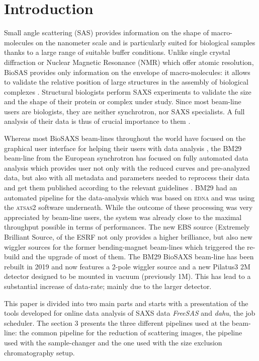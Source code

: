 \documentclass[preprint]{iucr}              %
\begin{document}
\section{Introduction}
Small angle scattering (SAS) provides information on the shape of macro-molecules on the nanometer scale and is particularly suited for biological samples thanks to a large range of suitable buffer conditions.
Unlike single crystal diffraction or Nuclear Magnetic Resonance (NMR) which offer atomic resolution, BioSAS provides only information on the envelope of macro-molecules: it allows to validate the relative position of large structures in the assembly of biological complexes \cite{biosaxs_rev2018}. 
Structural biologists perform SAXS experiments to validate the size and the shape of their protein or complex under study. 
Since most beam-line users are biologists, they are neither synchrotron, nor SAXS specialists.
A full analysis of their data is thus of crucial importance to them \cite{shibom}. 


Whereas most BioSAXS beam-lines throughout the world have focused on the graphical user interface for helping their users with data analysis \cite{dawn, als-biosaxs}, the BM29 beam-line from the European synchrotron \cite{BM29paper} has focused on fully automated data analysis which provides user not only with the reduced curves and pre-analyzed data, but also with all metadata and parameters needed to reprocess their data and get them published according to the relevant guidelines \cite{guidelines_2017}.
BM29 had an automated pipeline for the data-analysis which was based on \textsc{edna} \cite{edna} and was using the \textsc{atsas2} \cite{ATSAS2} software underneath. 
While the outcome of these processing was very appreciated by beam-line users, the system was already close to the maximal throughput possible in terms of performances. 
The new EBS source (Extremely Brilliant Source,  of the ESRF not only provides a higher brilliance, but also new wiggler sources for the former bending-magnet beam-lines which triggered the re-build and the upgrade of most of them. 
The BM29 BioSAXS beam-line has been rebuilt in 2019 and now features a 2-pole wiggler source and a new Pilatus3 2M detector designed to be mounted in vacuum (previously 1M). 
This has lead to a substantial increase of data-rate; mainly due to the larger detector. 

This paper is divided into two main parts and starts with a presentation of the tools developed for online data analysis of SAXS data \textit{FreeSAS} and \textit{dahu}, the job scheduler.
The section 3 presents the three different pipelines used at the beam-line: the common pipeline for the reduction of scattering images, the pipeline used with the sample-changer and the one used with the size exclusion chromatography setup.
\end{document}
